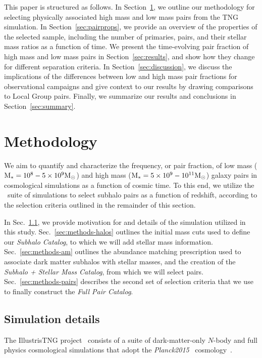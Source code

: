 \documentclass[twocolumn]{aastex631}
\newcommand{\ms}[1]{\ensuremath{M_{*{#1}}}}
\newcommand{\subcat}{\textit{Subhalo Catalog}}
\newcommand{\starcat}{\textit{Subhalo + Stellar Mass Catalog}}
\newcommand{\paircat}{\textit{Full Pair Catalog}}
\begin{document}
    This paper is structured as follows. 
    In Section~\ref{sec:methods}, we outline our methodology for selecting physically associated high mass and low mass pairs from the TNG simulation. 
    In Section~\ref{sec:pairprops}, we provide an overview of the properties of the selected sample, including the number of primaries, pairs, and their stellar mass ratios as a function of time. 
    We present the time-evolving pair fraction of high mass and low mass pairs in Section~\ref{sec:results}, and show how they change for different separation criteria. 
    In Section~\ref{sec:discussion}, we discuss the implications of the differences between low and high mass pair fractions for observational campaigns and give context to our results by drawing comparisons to Local Group pairs. 
    Finally, we summarize our results and conclusions in Section~\ref{sec:summary}.

 
\section{Methodology}\label{sec:methods}
We aim to quantify and characterize the frequency, or pair fraction, of low mass ($\rm\ms{}=10^{8}-5\times 10^{9}\Msun$) and high mass ($\rm\ms{}=5\times10^{9}-10^{11}\Msun$) galaxy pairs in cosmological simulations as a function of cosmic time. 
To this end, we utilize the \tng\ suite of simulations to select subhalo pairs as a function of redshift, according to the selection criteria outlined in the remainder of this section. 

In Sec.~\ref{sec:methods-sims}, we provide motivation for and details of the simulation utilized in this study.
Sec.~\ref{sec:methods-halos} outlines the initial mass cuts used to define our \subcat, to which we will add stellar mass information. 
Sec.~\ref{sec:methods-am} outlines the abundance matching prescription used to associate dark matter subhalos with stellar masses, and the creation of the \starcat, from which we will select pairs.
Sec.~\ref{sec:methods-pairs} describes the second set of selection criteria that we use to finally construct the \paircat. 

    \subsection{Simulation details} \label{sec:methods-sims}
    The IllustrisTNG project~\citep{TNG1, TNG2, TNG3, TNG4, TNG5} consists of a suite of dark-matter-only $N$-body and full physics cosmological simulations that adopt the \textit{Planck2015} \lcdm\  cosmology~\citep{Planck2015}.
    
\end{document}
